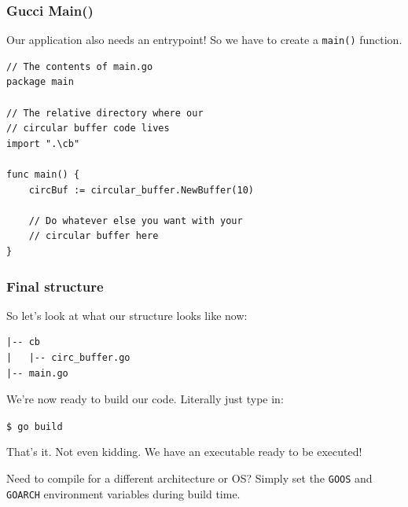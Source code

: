 \documentclass{beamer}
\begin{document}
\begin{frame}[fragile]
\frametitle{Gucci Main()}
Our application also needs an entrypoint! So we have to create a \texttt{main()} function.

\begin{lstlisting}
// The contents of main.go
package main

// The relative directory where our
// circular buffer code lives
import ".\cb"

func main() {
	circBuf := circular_buffer.NewBuffer(10)
	
	// Do whatever else you want with your 
	// circular buffer here
}
\end{lstlisting}
\end{frame}

\begin{frame}[fragile]
\frametitle{Final structure}

So let's look at what our structure looks like now:

\begin{lstlisting}
|-- cb
|   |-- circ_buffer.go
|-- main.go

\end{lstlisting}

We're now ready to build our code. Literally just type in: 

\texttt{\$ go build}

That's it. Not even kidding. We have an executable ready to be executed!

\vspace{0.5cm}

Need to compile for a different architecture or OS? Simply set the \texttt{GOOS} and \texttt{GOARCH} environment variables during build time.


\end{frame}
\end{document}
